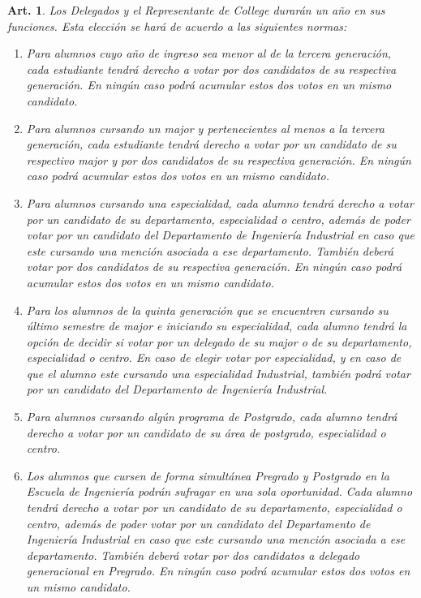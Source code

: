 \documentclass[letterpaper,11pt]{article}
\theoremstyle{plain}
\newtheorem{art}{Art.} %
\begin{document}
		\begin{art}\label{definicionesDelegados}
			Los Delegados y el Representante de College durarán un año en sus funciones. Esta elección se hará de acuerdo a las siguientes normas:
			\begin{enumerate}
				\item Para alumnos cuyo año de ingreso sea menor al de la tercera generación, cada estudiante tendrá derecho a votar por dos candidatos de su respectiva generación. En ningún caso podrá acumular estos dos votos en un mismo candidato.
				\item Para alumnos cursando un major y pertenecientes al menos a la tercera generación, cada estudiante tendrá derecho a votar por un candidato de su respectivo major y por dos candidatos de su respectiva generación. En ningún caso podrá acumular estos dos votos en un mismo candidato.
				\item Para alumnos cursando una especialidad, cada alumno tendrá derecho a votar por un candidato de su departamento, especialidad o centro, además de poder votar por un candidato del Departamento de Ingeniería Industrial en caso que este cursando una mención asociada a ese departamento. También deberá votar por dos candidatos de su respectiva generación. En ningún caso podrá acumular estos dos votos en un mismo candidato.
				\item Para los alumnos de la quinta generación que se encuentren cursando su último semestre de major e iniciando su especialidad, cada alumno tendrá la opción de decidir si votar por un delegado de su major o de su departamento, especialidad o centro. En caso de elegir votar por especialidad, y en caso de que el alumno este cursando una especialidad Industrial, también podrá votar por un candidato del Departamento de Ingeniería Industrial.
				\item Para alumnos cursando algún programa de Postgrado, cada alumno tendrá derecho a votar por un candidato de su área de postgrado, especialidad o centro.
				\item Los alumnos que cursen de forma simultánea Pregrado y Postgrado en la Escuela de Ingeniería podrán sufragar en una sola oportunidad. Cada alumno tendrá derecho a votar por un candidato de su departamento, especialidad o centro, además de poder votar por un candidato del Departamento de Ingeniería Industrial en caso que este cursando una mención asociada a ese departamento. También deberá votar por dos candidatos a delegado generacional en Pregrado. En ningún caso podrá acumular estos dos votos en un mismo candidato.

\end{enumerate}
\end{art}
\end{document}
